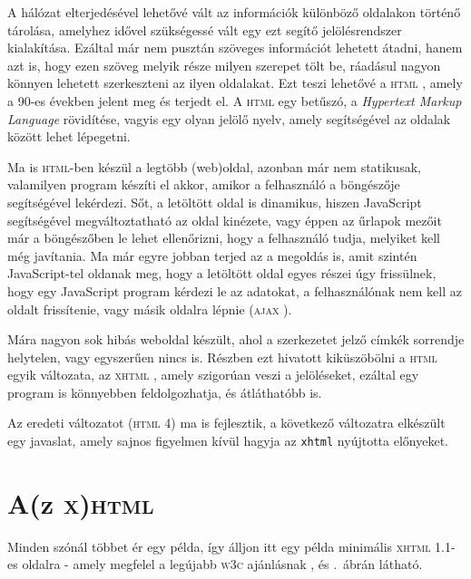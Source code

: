 

%
\label{cha:html}

A hálózat elterjedésével lehetővé vált az információk különböző oldalakon
történő tárolása, amelyhez idővel szükségessé vált egy ezt segítő
jelölésrendszer kialakítása. Ezáltal már nem pusztán szöveges információt
lehetett átadni, hanem azt is, hogy ezen szöveg melyik része milyen szerepet
tölt be, ráadásul nagyon könnyen lehetett szerkeszteni az ilyen oldalakat. Ezt
teszi lehetővé a \textsc{html} \cite{html}, amely a 90-es években jelent meg és
terjedt el. A \textsc{html} egy betűszó, a \emph{Hypertext Markup Language}
rövidítése, vagyis egy olyan jelölő nyelv, amely segítségével az oldalak között
lehet lépegetni.

Ma is \textsc{html}-ben készül a legtöbb (web)oldal, azonban már nem statikusak,
valamilyen program készíti el akkor, amikor a felhasználó a böngészője
segítségével lekérdezi. Sőt, a letöltött oldal is dinamikus, hiszen JavaScript
segítségével megváltoztatható az oldal kinézete, vagy éppen az űrlapok mezőit
már a böngészőben le lehet ellenőrizni, hogy a felhasználó tudja, melyiket kell
még javítania. Ma már egyre jobban terjed az a megoldás is, amit szintén
JavaScript-tel oldanak meg, hogy a letöltött oldal egyes részei úgy frissülnek,
hogy egy JavaScript program kérdezi le az adatokat, a felhasználónak nem kell az
oldalt frissítenie, vagy másik oldalra lépnie (\textsc{ajax} \cite{ajax}).

Mára nagyon sok hibás weboldal készült, ahol a szerkezetet jelző címkék
sorrendje helytelen, vagy egyszerűen nincs is. Részben ezt hivatott kiküszöbölni
a \textsc{html} egyik változata, az \textsc{xhtml} \cite{xhtml1,xhtml11}, amely
szigorúan veszi a jelöléseket, ezáltal egy program is könnyebben feldolgozhatja,
és átláthatóbb is.

Az eredeti változatot (\textsc{html 4}) ma is fejlesztik, a következő változatra
elkészült egy javaslat, amely sajnos figyelmen kívül hagyja az \texttt{xhtml}
nyújtotta előnyeket.


\section{A(z \textsc{x})\textsc{html}}

Minden szónál többet ér egy példa, így álljon itt egy példa minimális
\textsc{xhtml} 1.1-es oldalra - amely megfelel a legújabb \textsc{w3c}
ajánlásnak \cite{html}, és .\ ábrán látható.

